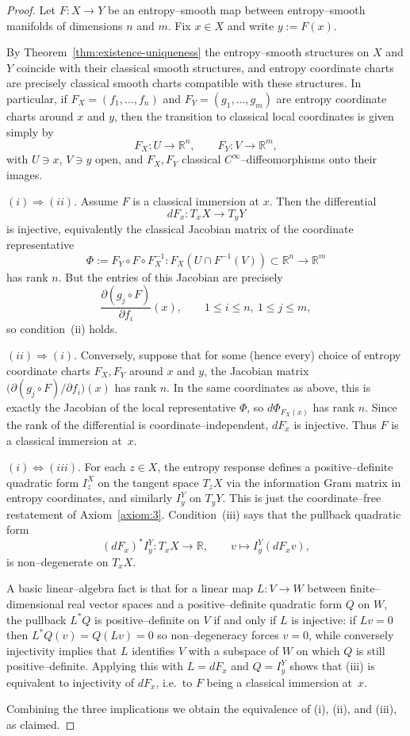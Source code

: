 \documentclass[11pt]{amsart}
\theoremstyle{definition}
\theoremstyle{remark}
\begin{document}
\begin{proof}
Let $F:X\to Y$ be an entropy–smooth map between entropy–smooth manifolds of
dimensions $n$ and $m$. Fix $x\in X$ and write $y:=F(x)$.

By Theorem~\ref{thm:existence-uniqueness} the entropy–smooth structures on $X$ and $Y$ coincide with their
classical smooth structures, and entropy coordinate charts are precisely
classical smooth charts compatible with these structures. In particular, if
$F_X=(f_1,\dots,f_n)$ and $F_Y=(g_1,\dots,g_m)$ are entropy coordinate charts
around $x$ and $y$, then the transition to classical local coordinates is
given simply by
\[
F_X:U\longrightarrow\mathbb{R}^n,\qquad
F_Y:V\longrightarrow\mathbb{R}^m,
\]
with $U\ni x$, $V\ni y$ open, and $F_X,F_Y$ classical $C^\infty$–diffeomorphisms
onto their images.

\smallskip\noindent
$(i)\Rightarrow(ii)$.
Assume $F$ is a classical immersion at $x$. Then the differential
\[
dF_x:T_xX\longrightarrow T_yY
\]
is injective, equivalently the classical Jacobian matrix of the coordinate
representative
\[
\Phi := F_Y\circ F\circ F_X^{-1}
: F_X(U\cap F^{-1}(V))\subset\mathbb{R}^n
  \longrightarrow
  \mathbb{R}^m
\]
has rank $n$. But the entries of this Jacobian are precisely
\[
\frac{\partial(g_j\circ F)}{\partial f_i}(x),\qquad
1\le i\le n,\ 1\le j\le m,
\]
so condition~(ii) holds.

\smallskip\noindent
$(ii)\Rightarrow(i)$.
Conversely, suppose that for some (hence every) choice of entropy coordinate
charts $F_X,F_Y$ around $x$ and $y$, the Jacobian matrix
$\bigl(\partial(g_j\circ F)/\partial f_i\bigr)(x)$ has rank $n$. In the same
coordinates as above, this is exactly the Jacobian of the local representative
$\Phi$, so $d\Phi_{F_X(x)}$ has rank $n$. Since the rank of the differential is
coordinate–independent, $dF_x$ is injective. Thus $F$ is a classical immersion
at~$x$.

\smallskip\noindent
$(i)\Leftrightarrow(iii)$.
For each $z\in X$, the entropy response defines a positive–definite quadratic
form $I^X_z$ on the tangent space $T_zX$ via the information Gram matrix in
entropy coordinates, and similarly $I^Y_y$ on $T_yY$. This is just the
coordinate–free restatement of Axiom~\ref{axiom:3}. Condition~(iii) says that the pullback
quadratic form
\[
(dF_x)^*I^Y_y : T_xX\longrightarrow\mathbb{R},\qquad
v\mapsto I^Y_y(dF_x v),
\]
is non–degenerate on $T_xX$.

A basic linear–algebra fact is that for a linear map
$L:V\to W$ between finite–dimensional real vector spaces and a positive–definite
quadratic form $Q$ on $W$, the pullback $L^*Q$ is positive–definite on $V$ if
and only if $L$ is injective: if $L v=0$ then $L^*Q(v)=Q(Lv)=0$ so
non–degeneracy forces $v=0$, while conversely injectivity implies that $L$
identifies $V$ with a subspace of $W$ on which $Q$ is still positive–definite.
Applying this with $L=dF_x$ and $Q=I^Y_y$ shows that (iii) is equivalent to
injectivity of $dF_x$, i.e.\ to $F$ being a classical immersion at~$x$.

Combining the three implications we obtain the equivalence of (i), (ii), and
(iii), as claimed.
\end{proof}
\end{document}
